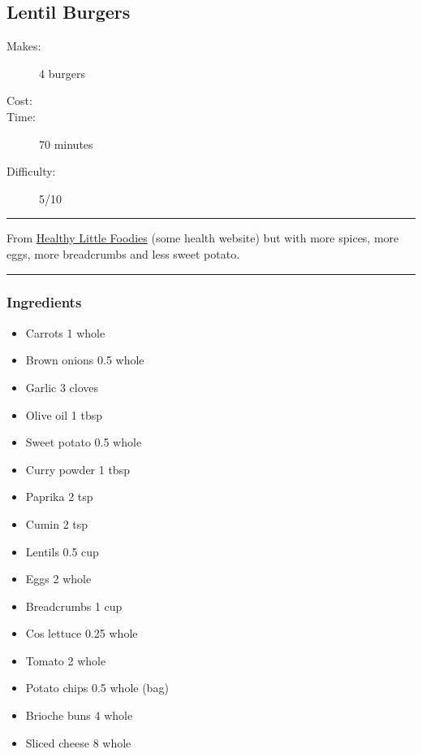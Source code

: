 \documentclass[]{article}
\begin{document}
\subsection*{\center\huge Lentil Burgers}
\begin{description}
\item[Makes:] 4 burgers
\item[Cost:] \textdollar
\item[Time:] 70 minutes
\item[Difficulty:] 5/10
\end{description}
\vspace{0.2cm}\hrule\vspace{0.5cm}
\begin{adjustwidth}{0.5 cm}{0.5 cm}

From \href{https://www.healthylittlefoodies.com/lentil-burgers/#Lentil_Burgers}{Healthy Little Foodies} (some health website) but with more spices, more eggs, more breadcrumbs and less sweet potato. \hfill{}\color{black}

\end{adjustwidth}
\vspace{0.5cm}\hrule
\subsubsection*{\Large Ingredients}
\begin{multicols}{2}
\begin{itemize}
 \item Carrots \hfill 1 whole
 \item Brown onions \hfill 0.5 whole
 \item Garlic \hfill 3 cloves
 \item Olive oil \hfill 1 tbsp
 \item Sweet potato \hfill 0.5 whole
 \item Curry powder \hfill 1 tbsp
 \item Paprika \hfill 2 tsp
 \item Cumin \hfill 2 tsp
 \item Lentils \hfill 0.5 cup
 \item Eggs \hfill 2 whole
 \item Breadcrumbs \hfill 1 cup
 \item Cos lettuce \hfill 0.25 whole
 \item Tomato \hfill 2 whole
 \item Potato chips \hfill 0.5 whole (bag)
 \item Brioche buns \hfill 4 whole
 \item Sliced cheese \hfill 8 whole
\end{itemize}
\end{multicols}
\end{document}
